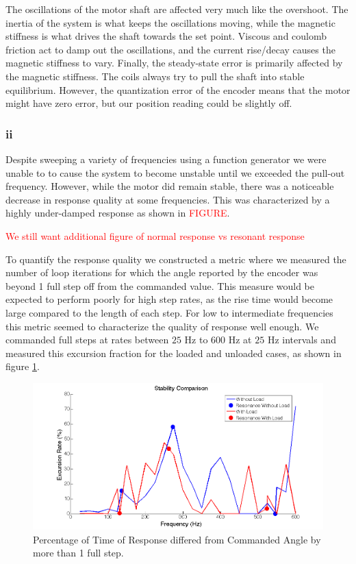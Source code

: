 \documentclass{article}
\newcommand{\xxx}[1]{\textcolor{red}{#1}}
\theoremstyle{plain}
\theoremstyle{definition}
\theoremstyle{remark}
\begin{document}
The oscillations of the motor shaft are affected very much like the overshoot. The inertia of the system is what keeps the oscillations moving, while the magnetic stiffness is what drives the shaft towards the set point. Viscous and coulomb friction act to damp out the oscillations, and the current rise/decay causes the magnetic stiffness to vary. Finally, the steady-state error is primarily affected by the magnetic stiffness. The coils always try to pull the shaft into stable equilibrium. However, the quantization error of the encoder means that the motor might have zero error, but our position reading could be slightly off.\\


\clearpage
\subsubsection*{ii}

Despite sweeping a variety of frequencies using a function generator we were unable to to cause the system to become unstable until we exceeded the pull-out frequency.  However, while the motor did remain stable, there was a noticeable decrease in response quality at some frequencies.  This was characterized by a highly under-damped response as shown in \xxx{FIGURE}.  

\xxx{We still want additional figure of normal response vs resonant response}

To quantify the response quality we constructed a metric where we measured the number of loop iterations for which the angle reported by the encoder was beyond 1 full step off from the commanded value.  This measure would be expected to perform poorly for high step rates, as the rise time would become large compared to the length of each step.  For low to intermediate frequencies this metric seemed to characterize the quality of response well enough.  We commanded full steps at rates between $25$ Hz to $600$ Hz at $25$ Hz intervals and measured this excursion fraction for the loaded and unloaded cases, as shown in figure \ref{q3aii}.



\begin{figure}[hbt]
\begin{center}
\includegraphics[width = 15cm]{ResonanceData.png}
\caption{Percentage of Time of Response differed from Commanded Angle by more than 1 full step.}
\label{q3aii}
\end{center}
\end{figure}
\end{document}
